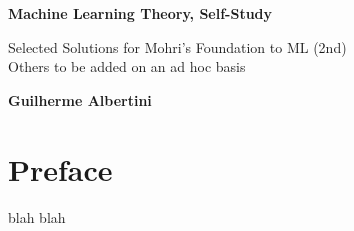 \documentclass[titlepage]{book}
\begin{document}
\begin{titlepage}
    \begin{center}
        \vspace*{1cm}
            
        \Huge
        \textbf{Machine Learning Theory, Self-Study}
            
        \vspace{0.5cm}
        \LARGE
        Selected Solutions for Mohri's Foundation to ML (2nd)\\
		Others to be added on an ad hoc basis\\
        \vspace{1.5cm}
            
        \textbf{Guilherme Albertini}
            
        \vfill
            
            
        \vspace{0.8cm}
            

        \Large
        
            
    \end{center}
\end{titlepage}

\frontmatter
\tableofcontents

\chapter*{Preface}

\TODO blah blah

\mainmatter



\end{document}
